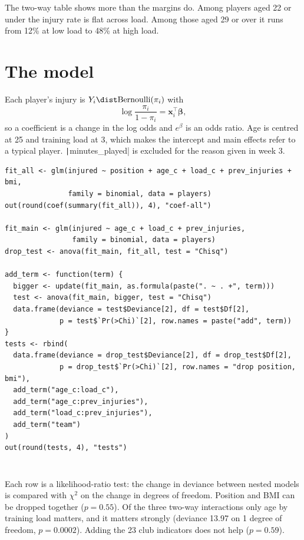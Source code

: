 \documentclass[12pt,notitlepage]{report}
\begin{document}
\inputminted{text}{output/rates-age-load.txt}

The two-way table shows more than the margins do. Among players aged 22 or
under the injury rate is flat across load. Among those aged 29 or over it
runs from 12\% at low load to 48\% at high load.

\section{The model}

Each player's injury is $Y_i \dist \text{Bernoulli}(\pi_i)$ with
\[
  \log\frac{\pi_i}{1 - \pi_i} = \bm{x}_i^\top \bm{\beta},
\]
so a coefficient is a change in the log odds and $e^{\beta}$ is an odds
ratio. Age is centred at 25 and training load at 3, which makes the intercept
and main effects refer to a typical player. \texttt|minutes_played| is
excluded for the reason given in week 3.

\begin{verbatim}
fit_all <- glm(injured ~ position + age_c + load_c + prev_injuries + bmi,
               family = binomial, data = players)
out(round(coef(summary(fit_all)), 4), "coef-all")

fit_main <- glm(injured ~ age_c + load_c + prev_injuries,
                family = binomial, data = players)
drop_test <- anova(fit_main, fit_all, test = "Chisq")

add_term <- function(term) {
  bigger <- update(fit_main, as.formula(paste(". ~ . +", term)))
  test <- anova(fit_main, bigger, test = "Chisq")
  data.frame(deviance = test$Deviance[2], df = test$Df[2],
             p = test$`Pr(>Chi)`[2], row.names = paste("add", term))
}
tests <- rbind(
  data.frame(deviance = drop_test$Deviance[2], df = drop_test$Df[2],
             p = drop_test$`Pr(>Chi)`[2], row.names = "drop position, bmi"),
  add_term("age_c:load_c"),
  add_term("age_c:prev_injuries"),
  add_term("load_c:prev_injuries"),
  add_term("team")
)
out(round(tests, 4), "tests")
\end{verbatim}

\inputminted{text}{output/coef-all.txt}
\inputminted{text}{output/tests.txt}

Each row is a likelihood-ratio test: the change in deviance between nested
models is compared with $\chi^2$ on the change in degrees of freedom.
Position and BMI can be dropped together ($p = 0.55$). Of the three two-way
interactions only age by training load matters, and it matters strongly
(deviance 13.97 on 1 degree of freedom, $p = 0.0002$). Adding the 23 club
indicators does not help ($p = 0.59$).
\end{document}

